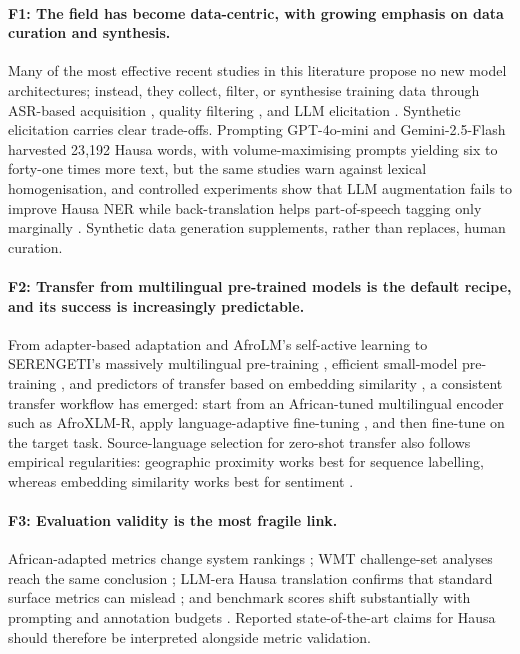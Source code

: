 \documentclass[sn-basic,pdflatex]{sn-jnl}
\begin{document}
\paragraph{F1: The field has become data-centric, with growing emphasis on data curation and synthesis.}
Many of the most effective recent studies in this literature propose no new model architectures; instead, they collect, filter, or synthesise training data through ASR-based acquisition \citep{p001}, quality filtering \citep{p084,p089}, and LLM elicitation \citep{p024}. Synthetic elicitation carries clear trade-offs. Prompting GPT-4o-mini and Gemini-2.5-Flash harvested 23{,}192 Hausa words, with volume-maximising prompts yielding six to forty-one times more text, but the same studies warn against lexical homogenisation, and controlled experiments show that LLM augmentation fails to improve Hausa NER while back-translation helps part-of-speech tagging only marginally \citep{p024,p075}. Synthetic data generation supplements, rather than replaces, human curation.
\paragraph{F2: Transfer from multilingual pre-trained models is the default recipe, and its success is increasingly predictable.}
From adapter-based adaptation \citep{p094} and AfroLM's self-active learning \citep{p095} to SERENGETI's massively multilingual pre-training \citep{p096}, efficient small-model pre-training \citep{p097}, and predictors of transfer based on embedding similarity \citep{p098}, a consistent transfer workflow has emerged: start from an African-tuned multilingual encoder such as AfroXLM-R, apply language-adaptive fine-tuning \citep{p053}, and then fine-tune on the target task. Source-language selection for zero-shot transfer also follows empirical regularities: geographic proximity works best for sequence labelling, whereas embedding similarity works best for sentiment \citep{p076}.
\paragraph{F3: Evaluation validity is the most fragile link.}
African-adapted metrics change system rankings \citep{p028,p092}; WMT challenge-set analyses reach the same conclusion \citep{p029,p031}; LLM-era Hausa translation confirms that standard surface metrics can mislead \citep{p033}; and benchmark scores shift substantially with prompting and annotation budgets \citep{p017,p018,p020}. Reported state-of-the-art claims for Hausa should therefore be interpreted alongside metric validation.
\end{document}
